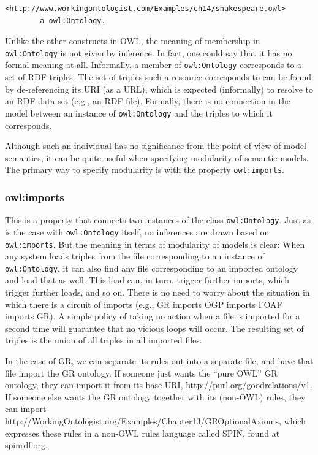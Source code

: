 \begin{lstlisting}
<http://www.workingontologist.com/Examples/ch14/shakespeare.owl>
        a owl:Ontology.
\end{lstlisting}

Unlike the other constructs in OWL, the meaning of membership in
\texttt{owl:Ontology} is not given by inference. In fact, one could say that it
has no formal meaning at all. Informally, a member of \texttt{owl:Ontology}
corresponds to a set of RDF triples. The set of triples such a resource
corresponds to can be found by de-referencing its URI (as a URL), which
is expected (informally) to resolve to an RDF data set (e.g., an RDF
file). Formally, there is no connection in the model between an instance
of \texttt{owl:Ontology} and the triples to which it corresponds.

Although such an individual has no significance from the point of view
of model semantics, it can
be quite useful when specifying modularity of semantic models. The
primary way to specify modularity is with the property \texttt{owl:imports}.

\subsubsection{owl:imports}

This is a property that connects two instances of the class
\texttt{owl:Ontology}. Just as is the case with \texttt{owl:Ontology} itself, no
inferences are drawn based on \texttt{owl:imports}. But the meaning in terms of
modularity of models is clear: When any system loads triples from the
file corresponding to an instance of \texttt{owl:Ontology}, it can also find any
file corresponding to an imported ontology and load that as well. This
load can, in turn, trigger further imports, which trigger further loads,
and so on. There is no need to worry about the situation in which there
is a circuit of imports (e.g., GR imports OGP imports FOAF imports GR).
A simple policy of taking no action when a file is imported for a second
time will guarantee that no vicious loops will occur. The resulting set
of triples is the union of all triples in all imported files.

In the case of GR, we can separate its rules out into a separate file,
and have that file import the GR ontology. If someone just wants the
``pure OWL'' GR ontology, they can import it from its base URI,
http://purl.org/goodrelations/v1.
If someone else wants the GR ontology together with its (non-OWL) rules,
they can import
http://WorkingOntologist.org/Examples/Chapter13/GROptionalAxioms,
which expresses these rules in a non-OWL rules language called SPIN,
found at spinrdf.org.

